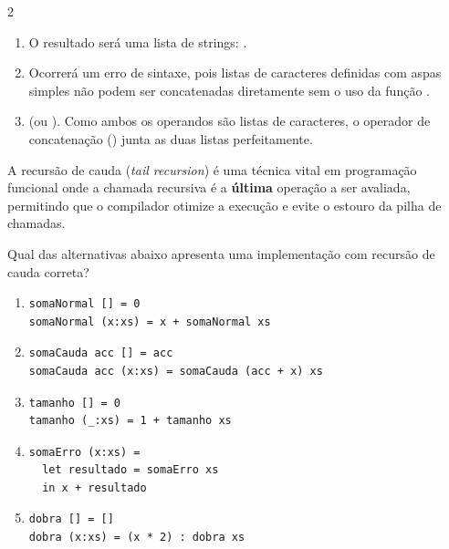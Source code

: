 \documentclass[a4paper,10pt,brazil]{article}
\begin{document}
\begin{multicols}{2}
\begin{enumerate}
  \item O resultado será uma lista de strings: \haskellinline{["Ha", "skell"]}.

  \item Ocorrerá um erro de sintaxe, pois listas de caracteres definidas com aspas simples não podem ser concatenadas diretamente sem o uso da função .

  \item {} (ou \haskellinline{['H', 'a', 's', 'k', 'e', 'l', 'l']}). Como ambos os operandos são listas de caracteres, o operador de concatenação (\haskellinline{++}) junta as duas listas perfeitamente.


\end{enumerate}

A recursão de cauda (\emph{tail recursion}) é uma técnica vital em programação funcional onde a chamada recursiva é a \textbf{última} operação a ser avaliada, permitindo que o compilador otimize a execução e evite o estouro da pilha de chamadas. 

Qual das alternativas abaixo apresenta uma implementação com recursão de cauda correta?

\begin{enumerate}
  \item \begin{verbatim}
somaNormal [] = 0
somaNormal (x:xs) = x + somaNormal xs
\end{verbatim}

  \item \begin{verbatim}
somaCauda acc [] = acc
somaCauda acc (x:xs) = somaCauda (acc + x) xs
\end{verbatim}

  \item \begin{verbatim}
tamanho [] = 0
tamanho (_:xs) = 1 + tamanho xs
\end{verbatim}

  \item \begin{verbatim}
somaErro (x:xs) = 
  let resultado = somaErro xs 
  in x + resultado
\end{verbatim}

  \item \begin{verbatim}
dobra [] = []
dobra (x:xs) = (x * 2) : dobra xs
\end{verbatim}



\end{enumerate}
\end{multicols}
\end{document}
